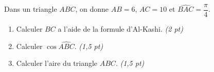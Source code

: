 Dans un triangle $ABC$, on donne $AB = 6$, $AC = 10$ et $\widehat{BAC} = \dfrac{\pi}{4}$.

\begin{enumerate}
  \item Calculer $BC$ a l'aide de la formule d'Al-Kashi. \hfill \textit{(2 pt)}
  \item Calculer $\cos\widehat{ABC}$. \hfill \textit{(1,5 pt)}
  \item Calculer l'aire du triangle $ABC$. \hfill \textit{(1,5 pt)}
\end{enumerate}


